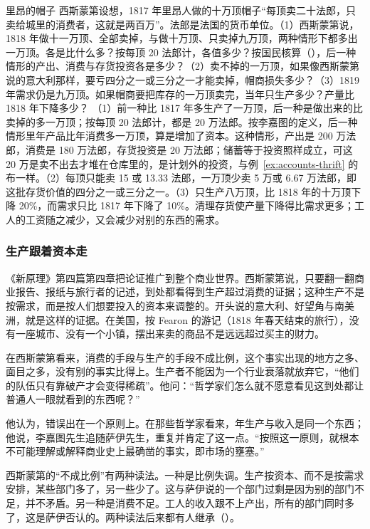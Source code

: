 \begin{example}{里昂的帽子}\label{ex:say-hats}
西斯蒙第设想，1817 年里昂人做的十万顶帽子“每顶卖二十法郎，只卖给城里的消费者，这就是两百万”\cite{sismondi1819}。法郎是法国的货币单位。（1）西斯蒙第说，1818 年做十一万顶、全部卖掉，与做十万顶、只卖掉九万顶，两种情形下都多出一万顶。各是比什么多？按每顶 20 法郎计，各值多少？按国民核算（），后一种情形的产出、消费与存货投资各是多少？（2）卖不掉的一万顶，如果像西斯蒙第说的意大利那样，要亏四分之一或三分之一才能卖掉，帽商损失多少？（3）1819 年需求仍是九万顶。如果帽商要把库存的一万顶卖完，当年只生产多少？产量比 1818 年下降多少？
\solution （1）前一种比 1817 年多生产了一万顶，后一种是做出来的比卖掉的多一万顶；按每顶 20 法郎计，都是 20 万法郎。按李嘉图的定义，后一种情形里年产品比年消费多一万顶，算是增加了资本。这种情形，产出是 200 万法郎，消费是 180 万法郎，存货投资是 20 万法郎；储蓄等于投资照样成立，可这 20 万是卖不出去才堆在仓库里的，是计划外的投资，与例~\ref{ex:accounts-thrift} 的布一样。（2）每顶只能卖 15 或 13.33 法郎，一万顶少卖 5 万或 6.67 万法郎，即这批存货价值的四分之一或三分之一。（3）只生产八万顶，比 1818 年的十万顶下降 20\%，而需求只比 1817 年下降了 10\%。清理存货使产量下降得比需求更多；工人的工资随之减少，又会减少对别的东西的需求。
\end{example}

\subsubsection{生产跟着资本走}
《新原理》第四篇第四章把论证推广到整个商业世界。西斯蒙第说，只要翻一翻商业报告、报纸与旅行者的记述，到处都看得到生产超过消费的证据；这种生产不是按需求，而是按人们想要投入的资本来调整的\cite{sismondi1819}。开头说的意大利、好望角与南美洲，就是这样的证据。在美国，按 Fearon 的游记（1818 年春天结束的旅行），没有一座城市、没有一个小镇，摆出来卖的商品不是远远超过买主的财力\cite{sismondi1819}。

在西斯蒙第看来，消费的手段与生产的手段不成比例，这个事实出现的地方之多、面目之多，没有别的事实比得上。生产者不能因为一个行业衰落就放弃它，“他们的队伍只有靠破产才会变得稀疏”\cite{sismondi1819}。他问：“哲学家们怎么就不愿意看见这到处都让普通人一眼就看到的东西呢？”\cite{sismondi1819}

他认为，错误出在一个原则上。在那些哲学家看来，年生产与收入是同一个东西；他说，李嘉图先生追随萨伊先生，重复并肯定了这一点\cite{sismondi1819}。“按照这一原则，就根本不可能理解或解释商业史上最确凿的事实，即市场的壅塞。”\cite{sismondi1819}

西斯蒙第的“不成比例”有两种读法。一种是比例失调。生产按资本、而不是按需求安排，某些部门多了，另一些少了。这与萨伊说的一个部门过剩是因为别的部门不足，并不矛盾。另一种是消费不足。工人的收入跟不上产出，所有的部门同时多了，这是萨伊否认的。两种读法后来都有人继承（）。


